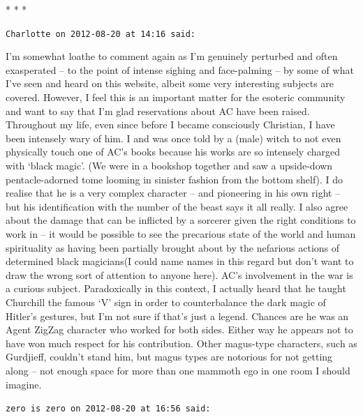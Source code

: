 
\begin{center}* * *\end{center}

\begin{footnotesize}\begin{sffamily}



\texttt{Charlotte on 2012-08-20 at 14:16 said: }

I'm somewhat loathe to comment again as I'm genuinely perturbed and often exasperated – to the point of intense sighing and face-palming – by some of what I've seen and heard on this website, albeit some very interesting subjects are covered. However, I feel this is an important matter for the esoteric community and want to say that I'm glad reservations about AC have been raised. Throughout my life, even since before I became consciously Christian, I have been intensely wary of him. I and was once told by a (male) witch to not even physically touch one of AC's books because his works are so intensely charged with `black magic’. (We were in a bookshop together and saw a upside-down pentacle-adorned tome looming in sinister fashion from the bottom shelf). I do realise that he is a very complex character – and pioneering in his own right – but his identification with the number of the beast says it all really. I also agree about the damage that can be inflicted by a sorcerer given the right conditions to work in – it would be possible to see the precarious state of the world and human spirituality as having been partially brought about by the nefarious actions of determined black magicians(I could name names in this regard but don't want to draw the wrong sort of attention to anyone here). AC's involvement in the war is a curious subject. Paradoxically in this context, I actually heard that he taught Churchill the famous `V' sign in order to counterbalance the dark magic of Hitler's gestures, but I'm not sure if that's just a legend. Chances are he was an Agent ZigZag character who worked for both sides. Either way he appears not to have won much respect for his contribution. Other magus-type characters, such as Gurdjieff, couldn't stand him, but magus types are notorious for not getting along – not enough space for more than one mammoth ego in one room I should imagine.


\hfill

\texttt{zero is zero on 2012-08-20 at 16:56 said: }


\end{sffamily}
\end{footnotesize}
